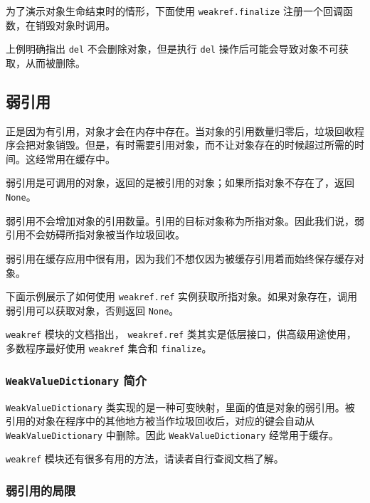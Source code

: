 为了演示对象生命结束时的情形，下面使用 \texttt{weakref.finalize} 注册一个回调函数，在销毁对象时调用。



上例明确指出 \texttt{del} 不会删除对象，但是执行 \texttt{del} 操作后可能会导致对象不可获取，从而被删除。

\subsection{弱引用}

正是因为有引用，对象才会在内存中存在。当对象的引用数量归零后，垃圾回收程序会把对象销毁。但是，有时需要引用对象，而不让对象存在的时候超过所需的时间。这经常用在缓存中。

弱引用是可调用的对象，返回的是被引用的对象；如果所指对象不存在了，返回 \texttt{None}。

弱引用不会增加对象的引用数量。引用的目标对象称为所指对象。因此我们说，弱引用不会妨碍所指对象被当作垃圾回收。

弱引用在缓存应用中很有用，因为我们不想仅因为被缓存引用着而始终保存缓存对象。

下面示例展示了如何使用 \texttt{weakref.ref} 实例获取所指对象。如果对象存在，调用弱引用可以获取对象，否则返回 \texttt{None}。



\texttt{weakref} 模块的文档指出， \texttt{weakref.ref} 类其实是低层接口，供高级用途使用，多数程序最好使用 \texttt{weakref} 集合和 \texttt{finalize}。

\subsubsection{\texttt{WeakValueDictionary} 简介}

\texttt{WeakValueDictionary} 类实现的是一种可变映射，里面的值是对象的弱引用。被引用的对象在程序中的其他地方被当作垃圾回收后，对应的键会自动从 \texttt{WeakValueDictionary} 中删除。因此 \texttt{WeakValueDictionary} 经常用于缓存。



\texttt{weakref} 模块还有很多有用的方法，请读者自行查阅文档了解。

\subsubsection{弱引用的局限}

